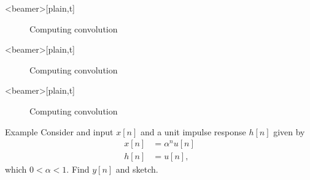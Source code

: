 \begin{frame}<beamer>[plain,t]
    {
    \begin{figure}
      \centering
      
      \caption{Computing convolution}\label{fi:example01_discrete_conv_01}
    \end{figure}
    }
\end{frame}

\begin{frame}<beamer>[plain,t]
    {
    \begin{figure}
      \centering
      
      \caption{Computing convolution}\label{fi:example01_discrete_conv_02}
    \end{figure}
    }
\end{frame}



\begin{frame}<beamer>[plain,t]
    {
    \begin{figure}
      \centering
      
      \caption{Computing convolution}\label{fi:example01_discrete_conv_03}
    \end{figure}
    }
\end{frame}




\begin{frame}{Example}
    Consider and input $x[n]$ and a unit impulse response $h[n]$ given by
    \begin{equation}
        \begin{split}
            x[n] &= \alpha^nu[n]\\
            h[n] &= u[n],
        \end{split}
    \end{equation}
    which $0 < \alpha < 1$. Find $y[n]$ and sketch.
\end{frame}

